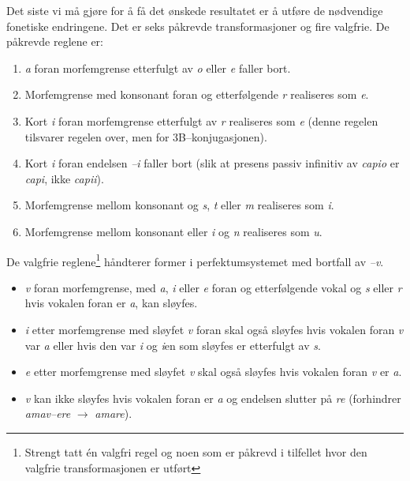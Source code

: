 \documentclass[a4paper]{article}
\begin{document}
Det siste vi m\aa{} gj\o{}re for \aa{} f\aa{} det \o{}nskede resultatet er
\aa{} utf\o{}re de n\o{}dvendige fonetiske endringene. Det er seks
p\aa{}krevde transformasjoner og fire valgfrie. De p\aa{}krevde reglene er:
\begin{enumerate}
\item \emph{a} foran morfemgrense etterfulgt av \emph{o} eller \emph{e} faller
bort.

\item Morfemgrense med konsonant foran og etterf\o{}lgende \emph{r} realiseres
som \emph{e}.

\item Kort \emph{i} foran morfemgrense etterfulgt av \emph{r} realiseres som
\emph{e} (denne regelen tilsvarer regelen over, men for 3B--konjugasjonen).

\item Kort \emph{i} foran endelsen \emph{--i} faller bort (slik at presens
passiv infinitiv av \emph{capio} er \emph{capi}, ikke \emph{capii}).

\item Morfemgrense mellom konsonant og \emph{s}, \emph{t} eller \emph{m}
realiseres som \emph{i}.

\item Morfemgrense mellom konsonant eller \emph{i} og \emph{n} realiseres som
\emph{u}.
\end{enumerate}

De valgfrie reglene\footnote{Strengt tatt \'en valgfri regel og noen som er
p\aa{}krevd i tilfellet hvor den valgfrie transformasjonen er utf\o{}rt}
h\aa{}ndterer former i perfektumsystemet med bortfall av \emph{--v}.

\begin{itemize}
\item \emph{v} foran morfemgrense, med \emph{a}, \emph{i} eller \emph{e} foran
og etterf\o{}lgende vokal og \emph{s} eller \emph{r} hvis vokalen foran er
\emph{a}, kan sl\o{}yfes.

\item \emph{i} etter morfemgrense med sl\o{}yfet \emph{v} foran skal ogs\aa{}
sl\o{}yfes hvis vokalen foran \emph{v} var \emph{a} eller hvis den var
\emph{i} og \emph{i}en som sl\o{}yfes er etterfulgt av \emph{s}.

\item \emph{e} etter morfemgrense med sl\o{}yfet \emph{v} skal ogs\aa{}
sl\o{}yfes hvis vokalen foran \emph{v} er \emph{a}.

\item \emph{v} kan ikke sl\o{}yfes hvis vokalen foran er \emph{a} og endelsen
slutter p\aa{} \emph{re} (forhindrer \emph{amav--ere} $\to$ \emph{amare}).
\end{itemize}
\end{document}
